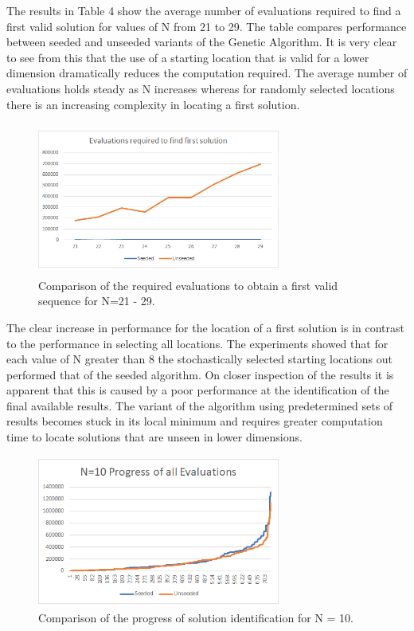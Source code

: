 \documentclass[conference]{IEEEtran}
\begin{document}
The results in Table 4 show the average number of evaluations required to find a first valid solution for values of N from 21 to 29. The table compares performance between seeded and unseeded variants of the Genetic Algorithm. It is very clear to see from this that the use of a starting location that is valid for a lower dimension dramatically reduces the computation required. The average number of evaluations holds steady as N increases whereas for randomly selected locations there is an increasing complexity in locating a first solution.

\begin{figure}[!htbp]
	\centering	
	\includegraphics[width=8cm, height=5cm]{EvaluationsFirstSolution}
	\caption{Comparison of the required evaluations to obtain a first valid sequence for N=21 - 29.}
\end{figure}

The clear increase in performance for the location of a first solution is in contrast to the performance in selecting all locations. The experiments showed that for each value of N greater than 8 the stochastically selected starting locations out performed that of the seeded algorithm. On closer inspection of the results it is apparent that this is caused by a poor performance at the identification of the final available results. The variant of the algorithm using predetermined sets of results becomes stuck in its local minimum and requires greater computation time to locate solutions that are unseen in lower dimensions.

\begin{figure}[!htbp]
	\centering	
	\includegraphics[width=8cm, height=5cm]{N10AllEvaluations}
	\caption{Comparison of the progress of solution identification for N = 10.}
\end{figure}
\end{document}
